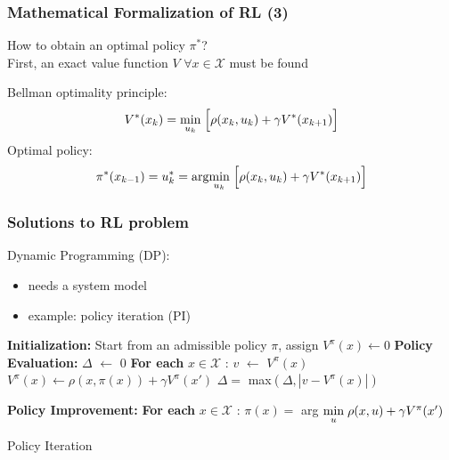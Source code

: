 \documentclass{beamer}
\begin{document}
	\begin{frame}\frametitle{Mathematical Formalization of RL (3)}
		How to obtain an optimal policy $ \pi^* $? \\ 
		\pause
		First, an exact value function $ V$ $ \forall x \in \mathcal{X} $ must be found
		\pause
		\begin{definition}
			Bellman optimality principle:
			\begin{equation}
			V^*(x_{k}) = \underset{u_k}{\text{min}} \hspace{1mm} \Big[ \rho(x_k,u_k) + \gamma V^*(x_{k+1}) \Big] 			
			\end{equation}
			Optimal policy:
			\begin{equation}
			\pi^*(x_{k-1}) = u^*_k = \text{arg} \underset{u_k}{\text{min}} \hspace{1mm} \Big[ \rho(x_k,u_k) + \gamma V^*(x_{k+1}) \Big] 				
			\end{equation}		
		\end{definition}
	\end{frame}
	
	\begin{frame}\frametitle{Solutions to RL problem}
		\vspace{2mm}
		\fontsize{8}{4}\selectfont 
	 	Dynamic Programming (DP):
	 	\begin{itemize}
	 		\item needs a system model \pause
	 		\item example: policy iteration (PI)
	 	\end{itemize}
		\pause
		\begin{algorithm}[H]
			\begin{algorithmic}[1]    			
				\fontsize{8}{4}\selectfont 
				\STATE \textbf{Initialization:} 
				\STATE \hspace{2mm} Start from an admissible policy $ \pi$, assign $ V^{\pi}(x) \leftarrow 0$  
				\REPEAT    			
				\STATE \textbf{Policy Evaluation:} 
				\REPEAT 	    			    
				\STATE 	$ \Delta $ $ \leftarrow $ 0 
				\STATE 	\textbf{For each} $ x \in \mathcal{X} $ :
				\STATE 	\hspace{5mm} $ v $ $ \leftarrow $ $ V^{\pi}(x) $ 
				\STATE 	\hspace{5mm} $ V^{\pi}(x) \leftarrow \rho(x, \pi(x)) +\gamma V^{\pi}(x') $ 
				\STATE 	\hspace{5mm} $ \Delta = $ max$ (\Delta, |v-V^{\pi}(x)|) $
				
				\STATE \textbf{Policy Improvement:} 
				\STATE \textbf{For each} $ x \in \mathcal{X} $ : 
				\STATE \hspace{5mm} $ \pi(x)=$  arg $\underset{u}{\text{min}} \hspace{1mm} \rho(x, u) +\gamma V^{\pi}(x') $  
			\end{algorithmic}
			\caption{Policy Iteration}
		\end{algorithm}
	\end{frame}
							
\end{document}
